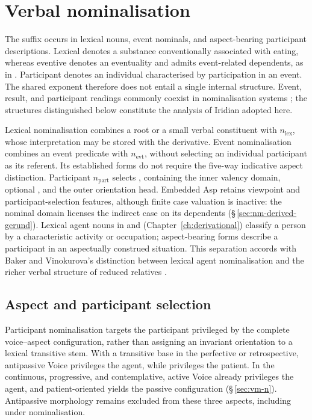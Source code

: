 \section{Verbal nominalisation}\label{sec:nominalised}


The suffix  occurs in lexical nouns, event nominals, and
aspect-bearing participant descriptions. Lexical  
denotes a substance conventionally associated with eating, whereas eventive
  denotes an eventuality and admits event-related
dependents, as in  . Participant   denotes an
individual characterised by participation in an event. The shared exponent
therefore does not entail a single internal structure. Event, result, and
participant readings commonly coexist in nominalisation systems
\cite{lieber2018}; the structures distinguished below constitute the analysis
of Iridian adopted here.

Lexical nominalisation combines a root or a small verbal constituent with
$n_{\mathrm{lex}}$, whose interpretation may be stored with the derivative.
Event nominalisation combines an event predicate with $n_{\mathrm{evt}}$,
without selecting an individual participant as its referent. Its established
forms do not require the five-way indicative aspect distinction. Participant
$n_{\mathrm{part}}$ selects , containing
the inner valency domain, optional , and the outer
orientation head.
Embedded Asp retains viewpoint and participant-selection features, although
finite case valuation is inactive: the nominal domain licenses the indirect
case on its dependents (§\,\ref{sec:nm-derived-gerund}). Lexical agent nouns
in  and  (Chapter~\ref{ch:derivational}) classify a
person by a characteristic activity or occupation; aspect-bearing 
forms describe a participant in an aspectually construed situation. This
separation accords with Baker and Vinokurova's distinction between lexical
agent nominalisation and the richer verbal structure of reduced relatives
\cite{bakervinokurova2009}.

\subsection{Aspect and participant selection}
Participant nominalisation targets the participant privileged by the complete
voice--aspect configuration, rather than assigning an invariant orientation to
a lexical transitive stem. With a transitive base in the perfective or
retrospective, antipassive Voice privileges the agent, while 
privileges the patient. In the continuous, progressive, and contemplative,
active Voice already privileges the agent, and patient-oriented 
yields the passive configuration (§\,\ref{sec:vm-n}). Antipassive morphology
remains excluded from these three aspects, including under nominalisation.


